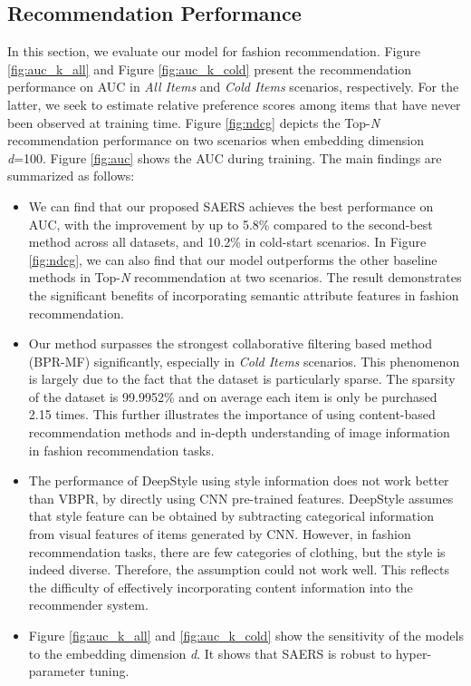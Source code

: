 \documentclass{article}
\begin{document}
\subsection{Recommendation Performance}
In this section, we evaluate our model for fashion recommendation. Figure \ref{fig:auc_k_all} and Figure \ref{fig:auc_k_cold} present the recommendation performance on AUC in \textit{All Items} and \textit{Cold Items} scenarios, respectively. For the latter, we seek to estimate relative preference scores among items that have never been observed at training time. Figure \ref{fig:ndcg} depicts the Top-\textit{N} recommendation performance on two scenarios when embedding dimension \textit{d}=100. Figure \ref{fig:auc} shows the AUC during training. The main findings are summarized as follows:
\begin{itemize}[leftmargin=*,itemsep=2.5pt]
	\setlength{\itemsep}{0pt}
	\setlength{\parsep}{0pt}
	\setlength{\parskip}{0pt}
\item We can find that our proposed SAERS achieves the best performance on AUC, with the improvement by up to 5.8\% compared to the second-best method across all datasets, and 10.2\% in cold-start scenarios. In Figure \ref{fig:ndcg}, we can also find that our model outperforms the other baseline methods in Top-\textit{N} recommendation at two scenarios. The result demonstrates the significant benefits of incorporating semantic attribute features in fashion recommendation.
\item Our method surpasses the strongest collaborative filtering based method (BPR-MF) significantly, especially in \textit{Cold Items} scenarios. This phenomenon is largely due to the fact that the dataset is particularly sparse. The sparsity of the dataset is 99.9952\% and on average each item is only be purchased 2.15 times. This further illustrates the importance of using content-based recommendation methods and in-depth understanding of image information in fashion recommendation tasks.
\item The performance of DeepStyle using style information does not work better than VBPR, by directly using CNN pre-trained features. DeepStyle assumes that style feature can be obtained by subtracting categorical information from visual features of items generated by CNN. However, in fashion recommendation tasks, there are few categories of clothing, but the style is indeed diverse. Therefore, the assumption could not work well. This reflects the difficulty of effectively incorporating content information into the recommender system.
\item Figure \ref{fig:auc_k_all} and \ref{fig:auc_k_cold} show the sensitivity of the models to the embedding dimension \textit{d}. It shows that SAERS is robust to hyper-parameter tuning.
\end{itemize}
\end{document}
